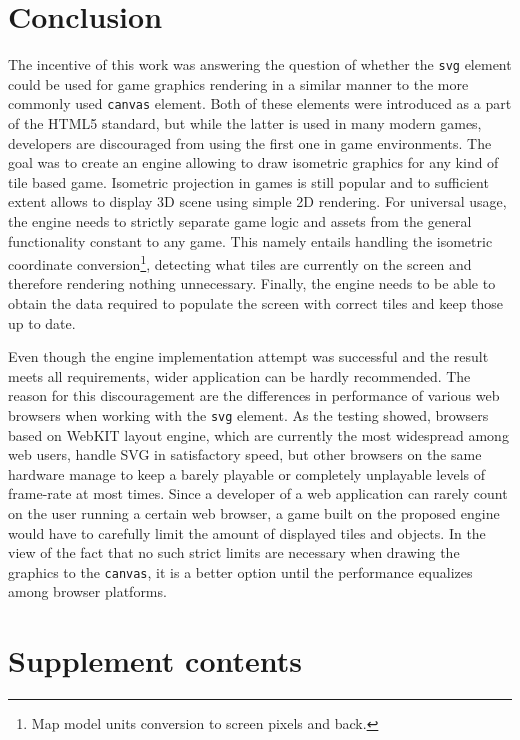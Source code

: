 \documentclass[11pt,oneside, final]{fithesis2}
\begin{document}
\chapter{Conclusion}
The incentive of this work was answering the question of whether the \texttt{svg} element could be used for game graphics rendering in a similar manner to the more commonly used \texttt{canvas} element. Both of these elements were introduced as a part of the HTML5 standard, but while the latter is used in many modern games, developers are discouraged from using the first one in game environments. The goal was to create an engine allowing to draw isometric graphics for any kind of tile based game. Isometric projection in games is still popular and to sufficient extent allows to display 3D scene using simple 2D rendering. For universal usage, the engine needs to strictly separate game logic and assets from the general functionality constant to any game. This namely entails handling the isometric coordinate conversion\footnote{Map model units conversion to screen pixels and back.}, detecting what tiles are currently on the screen and therefore rendering nothing unnecessary. Finally, the engine needs to be able to obtain the data required to populate the screen with correct tiles and keep those up to date.

Even though the engine implementation attempt was successful and the result meets all requirements, wider application can be hardly recommended. The reason for this discouragement are the differences in performance of various web browsers when working with the \texttt{svg} element. As the testing showed, browsers based on WebKIT layout engine, which are currently the most widespread among web users, handle SVG in satisfactory speed, but other browsers on the same hardware manage to keep a barely playable or completely unplayable levels of frame-rate at most times. Since a developer of a web application can rarely count on the user running a certain web browser, a game built on the proposed engine would have to carefully limit the amount of displayed tiles and objects. In the view of the fact that no such strict limits are necessary when drawing the graphics to the \texttt{canvas}, it is a better option until the performance equalizes among browser platforms.


\appendix
\chapter{Supplement contents}
\end{document}
